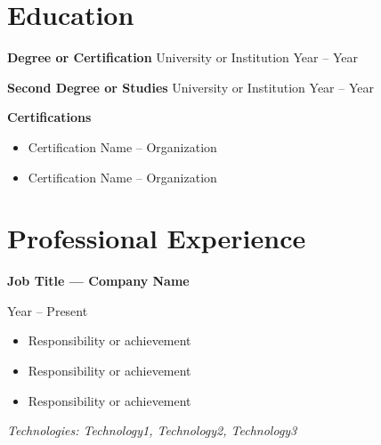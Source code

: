 \documentclass[10pt,a4paper]{article}
\begin{document}
	\section*{Education}
	
	\textbf{Degree or Certification}  
	University or Institution  
	Year – Year
	
	\textbf{Second Degree or Studies}  
	University or Institution  
	Year – Year
	
	
	\textbf{Certifications}
	
	\begin{itemize}
		
		
		\item Certification Name – Organization
		\item Certification Name – Organization
		
	\end{itemize}
	
	
	\section*{Professional Experience}
	
	\textbf{Job Title — Company Name}
	
	Year – Present
	
	\begin{itemize}
		
		
		\item Responsibility or achievement
		\item Responsibility or achievement
		\item Responsibility or achievement
		
	\end{itemize}
	
	\textit{Technologies: Technology1, Technology2, Technology3}
	
	
\end{document}
